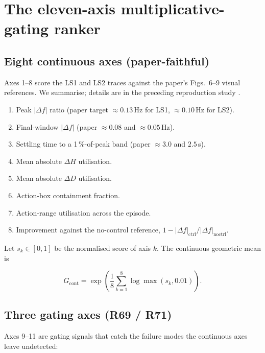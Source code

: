\documentclass[journal,onecolumn,11pt]{IEEEtran}
\begin{document}
\section{The eleven-axis multiplicative-gating ranker}\label{sec:ranker}

\subsection{Eight continuous axes (paper-faithful)}

Axes 1--8 score the LS1 and LS2 traces against the paper's
Figs.~6--9 visual references. We summarise; details are in the
preceding reproduction study \cite{wei2026reproduction}.

\begin{enumerate}
  \item[A1.] Peak $|\Delta f|$ ratio (paper target $\approx 0.13$\,Hz
        for LS1, $\approx 0.10$\,Hz for LS2).
  \item[A2.] Final-window $|\Delta f|$ (paper $\approx 0.08$ and
        $\approx 0.05$\,Hz).
  \item[A3.] Settling time to a 1\,\%-of-peak band
        (paper $\approx 3.0$ and $2.5$\,s).
  \item[A4.] Mean absolute $\Delta H$ utilisation.
  \item[A5.] Mean absolute $\Delta D$ utilisation.
  \item[A6.] Action-box containment fraction.
  \item[A7.] Action-range utilisation across the episode.
  \item[A8.] Improvement against the no-control reference,
        $1 - |\Delta f|_{\text{ctrl}}/|\Delta f|_{\text{noctrl}}$.
\end{enumerate}

Let $s_k \in [0, 1]$ be the normalised score of axis $k$. The
continuous geometric mean is

\begin{equation}\label{eq:cont}
  G_{\text{cont}}
    = \exp\!\left(
        \frac{1}{8} \sum_{k=1}^{8} \log\max(s_k, 0.01)
      \right).
\end{equation}

\subsection{Three gating axes (R69 / R71)}

Axes 9--11 are gating signals that catch the failure modes the
continuous axes leave undetected:
\end{document}
